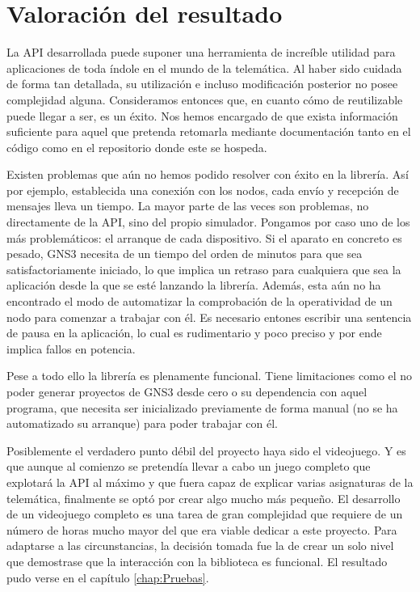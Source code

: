 \section{Valoración del resultado}
La API desarrollada puede suponer una herramienta de increíble utilidad para aplicaciones de toda índole en el mundo de la telemática. Al haber sido cuidada de forma tan detallada, su utilización e incluso modificación posterior no posee complejidad alguna. Consideramos entonces que, en cuanto cómo de reutilizable puede llegar a ser, es un éxito. Nos hemos encargado de que exista información suficiente para aquel que pretenda retomarla mediante documentación tanto en el código como en el repositorio donde este se hospeda.

Existen problemas que aún no hemos podido resolver con éxito en la librería. Así por ejemplo, establecida una conexión con los nodos, cada envío y recepción de mensajes lleva un tiempo. La mayor parte de las veces son problemas, no directamente de la API, sino del propio simulador. Pongamos por caso uno de los más problemáticos: el arranque de cada dispositivo. Si el aparato en concreto es pesado, GNS3 necesita de un tiempo del orden de minutos para que sea satisfactoriamente iniciado, lo que implica un retraso para cualquiera que sea la aplicación desde la que se esté lanzando la librería. Además, esta aún no ha encontrado el modo de automatizar la comprobación de la operatividad de un nodo para comenzar a trabajar con él. Es necesario entones escribir una sentencia de pausa en la aplicación, lo cual es rudimentario y poco preciso y por ende implica fallos en potencia.

Pese a todo ello la librería es plenamente funcional. Tiene limitaciones como el no poder generar proyectos de GNS3 desde cero o su dependencia con aquel programa, que necesita ser inicializado previamente de forma manual (no se ha automatizado su arranque) para poder trabajar con él.

Posiblemente el verdadero punto débil del proyecto haya sido el videojuego. Y es que aunque al comienzo se pretendía llevar a cabo un juego completo que explotará la API al máximo y que fuera capaz de explicar varias asignaturas de la telemática, finalmente se optó por crear algo mucho más pequeño. El desarrollo de un videojuego completo es una tarea de gran complejidad que requiere de un número de horas mucho mayor del que era viable dedicar a este proyecto. Para adaptarse a las circunstancias, la decisión tomada fue la de crear un solo nivel que demostrase que la interacción con la biblioteca es funcional. El resultado pudo verse en el capítulo \ref{chap:Pruebas}.

